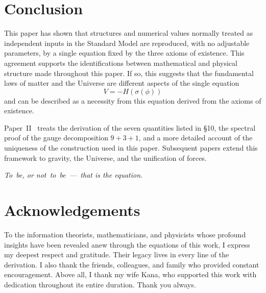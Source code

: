 \documentclass[12pt,a4paper]{article}
\begin{document}
\section{Conclusion}\label{sec:conclusion}

This paper has shown that structures and numerical values normally
treated as independent inputs in the Standard Model are reproduced,
with no adjustable parameters, by a single equation fixed by the
three axioms of existence. This agreement supports the
identifications between mathematical and physical structure made
throughout this paper. If so, this suggests that the
fundamental laws of matter and the Universe are different aspects of
the single equation
\[
  V = -H(\sigma(\phi))
\]
and can be described as a necessity from this equation derived from
the axioms of existence.

Paper~II~\cite{paper2} treats the derivation of the seven quantities listed in \S10,
 the spectral proof of the gauge decomposition $9{+}3{+}1$,
and a more detailed account of the uniqueness of the construction used
in this paper.
Subsequent papers extend this framework to gravity, the Universe, and
the unification of forces.

\medskip
\noindent
\textit{To~be, or not~to~be~---~that is the equation.}

\section*{Acknowledgements}
To the information theorists, mathematicians, and physicists
whose profound insights have been revealed anew through the
equations of this work, I express my deepest respect and gratitude.
Their legacy lives in every line of the derivation.
I also thank the friends, colleagues, and family who provided
constant encouragement.
Above all, I thank my wife Kana, who supported this work with
dedication throughout its entire duration. Thank you always.

\small
\end{document}
